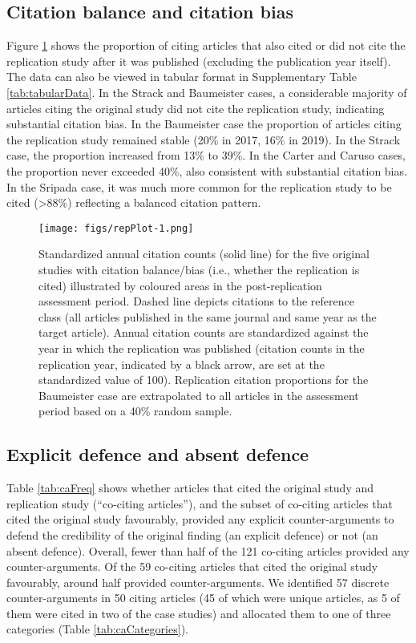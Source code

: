 \documentclass[
  american,
  ,man,floatsintext]{apa6}
\begin{document}
\hypertarget{citation-balance-and-citation-bias}{%
\subsection{Citation balance and citation bias}\label{citation-balance-and-citation-bias}}

Figure \ref{fig:repPlot} shows the proportion of citing articles that also cited or did not cite the replication study after it was published (excluding the publication year itself). The data can also be viewed in tabular format in Supplementary Table \ref{tab:tabularData}. In the Strack and Baumeister cases, a considerable majority of articles citing the original study did not cite the replication study, indicating substantial citation bias. In the Baumeister case the proportion of articles citing the replication study remained stable (20\% in 2017, 16\% in 2019). In the Strack case, the proportion increased from 13\% to 39\%. In the Carter and Caruso cases, the proportion never exceeded 40\%, also consistent with substantial citation bias. In the Sripada case, it was much more common for the replication study to be cited (\textgreater88\%) reflecting a balanced citation pattern.

\begin{figure}
\centering
\texttt{[image: figs/repPlot-1.png]}
\caption{\label{fig:repPlot}Standardized annual citation counts (solid line) for the five original studies with citation balance/bias (i.e., whether the replication is cited) illustrated by coloured areas in the post-replication assessment period. Dashed line depicts citations to the reference class (all articles published in the same journal and same year as the target article). Annual citation counts are standardized against the year in which the replication was published (citation counts in the replication year, indicated by a black arrow, are set at the standardized value of 100). Replication citation proportions for the Baumeister case are extrapolated to all articles in the assessment period based on a 40\% random sample.}
\end{figure}

\hypertarget{explicit-defence-and-absent-defence}{%
\subsection{Explicit defence and absent defence}\label{explicit-defence-and-absent-defence}}

Table \ref{tab:caFreq} shows whether articles that cited the original study and replication study (\enquote{co-citing articles}), and the subset of co-citing articles that cited the original study favourably, provided any explicit counter-arguments to defend the credibility of the original finding (an explicit defence) or not (an absent defence). Overall, fewer than half of the 121 co-citing articles provided any counter-arguments. Of the 59 co-citing articles that cited the original study favourably, around half provided counter-arguments. We identified 57 discrete counter-arguments in 50 citing articles (45 of which were unique articles, as 5 of them were cited in two of the case studies) and allocated them to one of three categories (Table \ref{tab:caCategories}).
\end{document}
